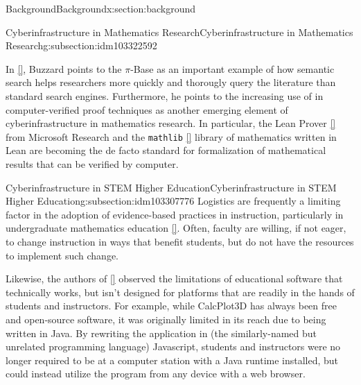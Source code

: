 \documentclass[oneside,10pt,]{article}
\newcommand{\xreffont}{\relax}
\newcommand{\mono}[1]{\texttt{#1}}
\begin{document}
\begin{sectionptx}{Background}{}{Background}{}{}{x:section:background}
\begin{subsectionptx}{Cyberinfrastructure in Mathematics Research}{}{Cyberinfrastructure in Mathematics Research}{}{}{g:subsection:idm103322592}
\par
In \hyperlink{x:biblio:biblio-buzzard}{[{\xreffont 7}]}, Buzzard points to the \(\pi\)-Base as an important example of how semantic search helps researchers more quickly and thorougly query the literature than standard search engines. Furthermore, he points to the increasing use of in computer-verified proof techniques as another emerging element of cyberinfrastructure in mathematics research. In particular, the Lean Prover \hyperlink{x:biblio:biblio-lean}{[{\xreffont 19}]} from Microsoft Research and the \mono{mathlib} \hyperlink{x:biblio:biblio-mathlib}{[{\xreffont 17}]} library of mathematics written in Lean are becoming the de facto standard for formalization of mathematical results that can be verified by computer.%
\end{subsectionptx}
%
%
\typeout{************************************************}
\typeout{************************************************}
%
\begin{subsectionptx}{Cyberinfrastructure in STEM Higher Education}{}{Cyberinfrastructure in STEM Higher Education}{}{}{g:subsection:idm103307776}
Logistics are frequently a limiting factor in the adoption of evidence-based practices in instruction, particularly in undergraduate mathematics education \hyperlink{x:biblio:biblio-logistics}{[{\xreffont 25}]}. Often, faculty are willing, if not eager, to change instruction in ways that benefit students, but do not have the resources to implement such change.%
\par
Likewise, the authors of \hyperlink{x:biblio:biblio-calcplot3d}{[{\xreffont 26}]} observed the limitations of educational software that technically works, but isn't designed for platforms that are readily in the hands of students and instructors. For example, while CalcPlot3D has always been free and open-source software, it was originally limited in its reach due to being written in Java. By rewriting the application in (the similarly-named but unrelated programming language) Javascript, students and instructors were no longer required to be at a computer station with a Java runtime installed, but could instead utilize the program from any device with a web browser.%
\par

\end{subsectionptx}
\end{sectionptx}
\end{document}
